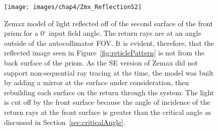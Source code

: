 \begin{figure}[H]		%
\begin{center}
\texttt{[image: images/chap4/Zmx\_ReflectionS2]}
\caption{Zemax model of light reflected off of the second surface of the front prism for a 0$^\circ$ input field angle. The return rays are at an angle outside of the autocollimator FOV. It is evident, therefore, that the reflected image seen in Figure~\ref{fig:reticlePattern} is not from the back surface of the prism. As the SE version of Zemax did not support non-sequential ray tracing at the time, the model was built by adding a mirror at the surface under consideration, then rebuilding each surface on the return through the system. The light is cut off by the front surface because the angle of incidence of the return rays at the front surface is greater than the critical angle as discussed in Section~\ref{sec:criticalAngle}.}
\label{fig:Zmx_ReflectionS2}
\end{center}
\end{figure}

